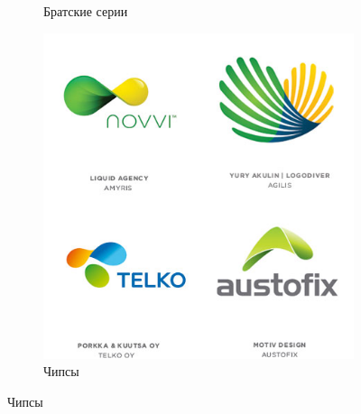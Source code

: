 \begin{figure}[h!]
\begin{subfigure}{.45\textwidth}
    \caption{Братские серии}
    \label{fig:logolounge:2012:bratskie-serii}
  \end{subfigure}
  \hfill
  \centering
  \begin{subfigure}{.45\textwidth}
    \centering
    \includegraphics[width=\linewidth]{images/supplement/logolounge/2012/Chipsi}
    \caption{Чипсы}
    \label{fig:logolounge:2012:chipsi}
  \end{subfigure}
\end{figure}

